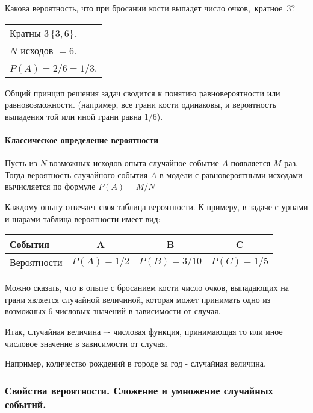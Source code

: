 \documentclass[a4paper,twoside,12pt]{report}
\begin{document}
	 Какова вероятность, что при бросании кости выпадет число очков,~кратное~3?

	\strut


	\begin{tabular}{l}

	Кратны $3\,\{3,6\}$.\\ 

	$N$ исходов $ = 6$.\\

	$P(A) = 2/6 = 1/3$.\\

	\end{tabular}


	\sstrut Общий принцип решения задач сводится к понятию равновероятности или равновозможности. (например, все грани кости одинаковы, и вероятность выпадения той или иной грани равна $1/6$).



\paragraph{Классическое определение вероятности}

	Пусть из $N$ возможных исходов опыта случайное событие $A$ появляется $M$ раз. Тогда вероятность случайного события $A$ в модели с равновероятными исходами вычисляется по формуле $P(A) = M/N$ 

	Каждому опыту отвечает своя таблица вероятности. К примеру, в задаче с урнами и шарами таблица вероятности имеет вид: \strut


	\begin{tabular}{|l|c|c|c|}
	\hline
		События & A & B & C\\
	\hline	
		Вероятности & $P(A) = 1/2$ & $P(B) = 3/10$ & $P(C) = 1/5$\\
	\hline
	\end{tabular}


	\strut Можно сказать, что в опыте с бросанием кости число очков, выпадающих на грани является случайной величиной, которая может принимать одно из возможных 6 числовых значений в зависимости от случая.

	Итак, случайная величина –- числовая функция, принимающая то или иное числовое значение в зависимости от случая.

	Например, количество рождений в городе за год - случайная величина.





\subsubsection{Свойства вероятности. Сложение и умножение случайных событий.}
\end{document}
